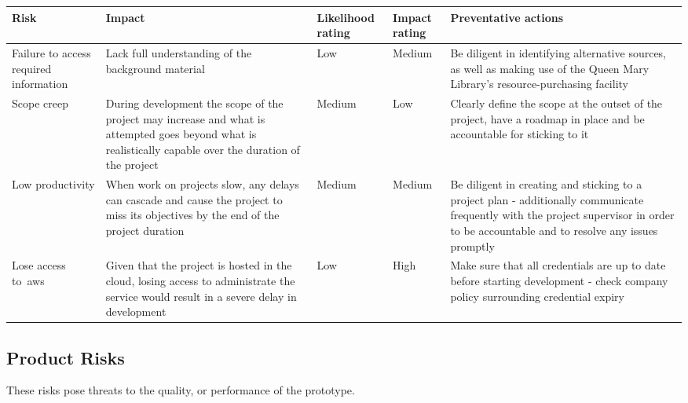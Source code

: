 \begin{tabularx}{\textwidth}{szssz}
    \caption{Project Risks}\label{tab:project-risks}\\
    \hline
    \textbf{Risk} & \textbf{Impact} & \textbf{Likelihood rating} & \textbf{Impact rating} & \textbf{Preventative actions} \\\hline
    Failure to access required information & Lack full understanding of the background material & Low & Medium & Be diligent in identifying alternative sources, as well as making use of the Queen Mary Library’s resource-purchasing facility \\\hline
    Scope creep & During development the scope of the project may increase and what is attempted goes beyond what is realistically capable over the duration of the project & Medium & Low & Clearly define the scope at the outset of the project, have a roadmap in place and be accountable for sticking to it \\\hline
    Low productivity & When work on projects slow, any delays can cascade and cause the project to miss its objectives by the end of the project duration & Medium & Medium & Be diligent in creating and sticking to a project plan - additionally communicate frequently with the project supervisor in order to be accountable and to resolve any issues promptly \\\hline
    Lose access to~\gls{aws} & Given that the project is hosted in the cloud, losing access to administrate the service would result in a severe delay in development & Low & High & Make sure that all credentials are up to date before starting development - check company policy surrounding credential expiry \\\hline

\end{tabularx}

\subsection{Product Risks}\label{subsec:product-risks}

These risks pose threats to the quality, or performance of the prototype.

